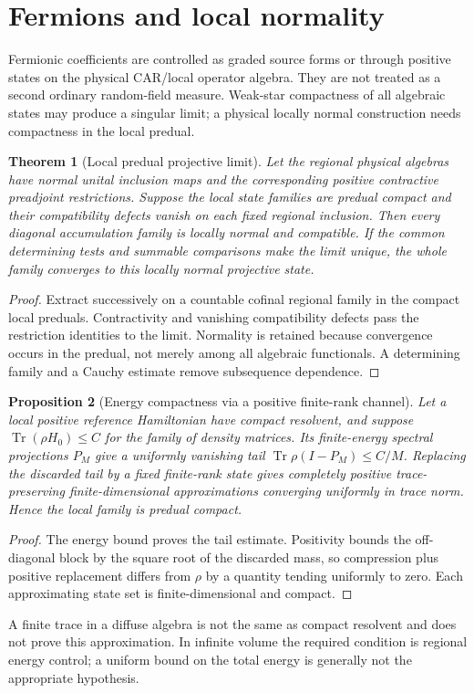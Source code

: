 \documentclass[11pt,a4paper,oneside]{book}
\theoremstyle{plain}
\newtheorem{theorem}{Theorem}[chapter]
\newtheorem{proposition}[theorem]{Proposition}
\theoremstyle{definition}
\theoremstyle{remark}
\newcommand{\Tr}{\operatorname{Tr}}
\newcommand{\src}[2]{\cite{#1}}
\begin{document}
\section{Fermions and local normality}
Fermionic coefficients are controlled as graded source forms or through positive states on the physical CAR/local operator algebra. They are not treated as a second ordinary random-field measure. Weak-star compactness of all algebraic states may produce a singular limit; a physical locally normal construction needs compactness in the local predual.

\begin{theorem}[Local predual projective limit]
\label{thm:predual}
Let the regional physical algebras have normal unital inclusion maps and the corresponding positive contractive preadjoint restrictions. Suppose the local state families are predual compact and their compatibility defects vanish on each fixed regional inclusion. Then every diagonal accumulation family is locally normal and compatible. If the common determining tests and summable comparisons make the limit unique, the whole family converges to this locally normal projective state.
\end{theorem}
\begin{proof}
Extract successively on a countable cofinal regional family in the compact local preduals. Contractivity and vanishing compatibility defects pass the restriction identities to the limit. Normality is retained because convergence occurs in the predual, not merely among all algebraic functionals. A determining family and a Cauchy estimate remove subsequence dependence.
\end{proof}
\src{R12}{prop:v12v91-restriction,thm:v12v91-projective}

\begin{proposition}[Energy compactness via a positive finite-rank channel]
\label{prop:energy-compact}
Let a local positive reference Hamiltonian have compact resolvent, and suppose $\Tr(\rho H_0)\le C$ for the family of density matrices. Its finite-energy spectral projections $P_M$ give a uniformly vanishing tail $\Tr\rho(I-P_M)\le C/M$. Replacing the discarded tail by a fixed finite-rank state gives completely positive trace-preserving finite-dimensional approximations converging uniformly in trace norm. Hence the local family is predual compact.
\end{proposition}
\begin{proof}
The energy bound proves the tail estimate. Positivity bounds the off-diagonal block by the square root of the discarded mass, so compression plus positive replacement differs from $\rho$ by a quantity tending uniformly to zero. Each approximating state set is finite-dimensional and compact.
\end{proof}
\src{R12}{prop:v12v92-finite-rank,cor:v12v92-energy}
A finite trace in a diffuse algebra is not the same as compact resolvent and does not prove this approximation. In infinite volume the required condition is regional energy control; a uniform bound on the total energy is generally not the appropriate hypothesis.
\end{document}
